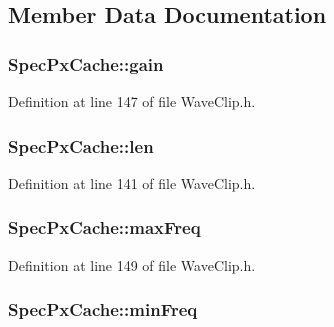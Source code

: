 \subsection{Member Data Documentation}
\subsubsection[{\texorpdfstring{gain}{gain}}]{ Spec\+Px\+Cache\+::gain}\hypertarget{class_spec_px_cache_a544e859e9069386b5558b24dd2a23c9d}{}\label{class_spec_px_cache_a544e859e9069386b5558b24dd2a23c9d}


Definition at line 147 of file Wave\+Clip.\+h.

\subsubsection[{\texorpdfstring{len}{len}}]{ Spec\+Px\+Cache\+::len}\hypertarget{class_spec_px_cache_a35dfc2e3b2a17e94fb4c77847a5356ce}{}\label{class_spec_px_cache_a35dfc2e3b2a17e94fb4c77847a5356ce}


Definition at line 141 of file Wave\+Clip.\+h.

\subsubsection[{\texorpdfstring{max\+Freq}{maxFreq}}]{ Spec\+Px\+Cache\+::max\+Freq}\hypertarget{class_spec_px_cache_a2a248bbe2e6090efba5eee5678849a38}{}\label{class_spec_px_cache_a2a248bbe2e6090efba5eee5678849a38}


Definition at line 149 of file Wave\+Clip.\+h.

\subsubsection[{\texorpdfstring{min\+Freq}{minFreq}}]{ Spec\+Px\+Cache\+::min\+Freq}\hypertarget{class_spec_px_cache_a7a9ac3b5030ffe0f6dc83821126108aa}{}\label{class_spec_px_cache_a7a9ac3b5030ffe0f6dc83821126108aa}


